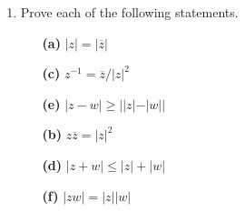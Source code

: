 {\begin{enumerate}
\begin{minipage}[t]{4.6in}
\begin{minipage}[t]{2.25in}
\begin{itemize}
 \item[{\bf (b)}]
$(1-i)^{6}$
 
 \item[{\bf (d)}]
$(-i)^{10}$
 
 \item[{\bf (f)}]
$(-\sqrt{2} - \sqrt{2}\, i)^{12}$
 
\end{itemize}
\end{minipage}
\end{minipage}
 
\vspace{2pt}        %
 
 
 
\bf\item\rm
Prove each of the following statements.
 
 
\vspace{3pt}        %
 
\hspace{-7pt}
\begin{minipage}[t]{4.6in}
\noindent
\begin{minipage}[t]{2.25in}
\begin{itemize}
 
 \item[{\bf (a)}]
$|z| = | \overline{z}|$
 
 
 \item[{\bf (c)}]
$z^{-1} = \overline{z} / |z|^2$
 
 \item[{\bf (e)}]
$|z - w| \geq | |z| - |w||$
 
\end{itemize}
\end{minipage} \hfill
\begin{minipage}[t]{2.25in}
\begin{itemize}
 
 \item[{\bf (b)}]
$z \overline{z} = |z|^2$
 
 \item[{\bf (d)}]
$|z +w| \leq |z| + |w|$
 
 \item[{\bf (f)}]
$|z w| = |z|  |w|$
 
\end{itemize}
\end{minipage}
\end{minipage}
 
\vspace{2pt}        %
 

\end{enumerate}}
